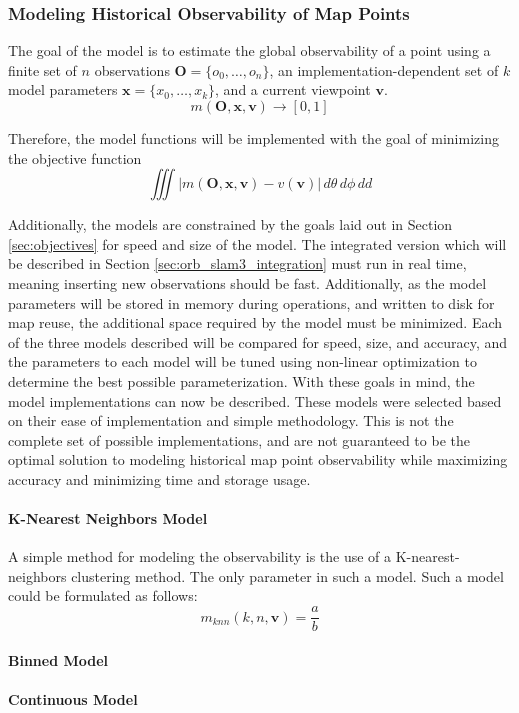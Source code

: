 \subsubsection{Modeling Historical Observability of Map Points}

The goal of the model is to estimate the global observability of a point using a finite set of $n$ observations $\boldsymbol{O} = \{o_0,\dots,o_n\}$, an implementation-dependent set of $k$ model parameters $\boldsymbol{x}=\{x_0,\dots,x_k\}$, and a current viewpoint $\boldsymbol{v}$.
$$
    m(\boldsymbol{O},\boldsymbol{x},\boldsymbol{v})\to[0,1]
$$

Therefore, the model functions will be implemented with the goal of minimizing the objective function
$$
    \iiint |m(\boldsymbol{O},\boldsymbol{x},\boldsymbol{v}) - v(\boldsymbol{v})| \,d\theta\,d\phi\,dd
$$

Additionally, the models are constrained by the goals laid out in Section \ref{sec:objectives} for speed and size of the model. The integrated version which will be described in Section \ref{sec:orb_slam3_integration} must run in real time, meaning inserting new observations should be fast. Additionally, as the model parameters will be stored in memory during operations, and written to disk for map reuse, the additional space required by the model must be minimized. Each of the three models described will be compared for speed, size, and accuracy, and the parameters to each model will be tuned using non-linear optimization to determine the best possible parameterization. With these goals in mind, the model implementations can now be described. These models were selected based on their ease of implementation and simple methodology. This is not the complete set of possible implementations, and are not guaranteed to be the optimal solution to modeling historical map point observability while maximizing accuracy and minimizing time and storage usage.

\paragraph{K-Nearest Neighbors Model}
A simple method for modeling the observability is the use of a K-nearest-neighbors clustering method. The only parameter in such a model. Such a model could be formulated as follows:
$$
    m_{knn}(k, n, \boldsymbol{v}) = \frac{a}{b}
$$
\paragraph{Binned Model}
\paragraph{Continuous Model}